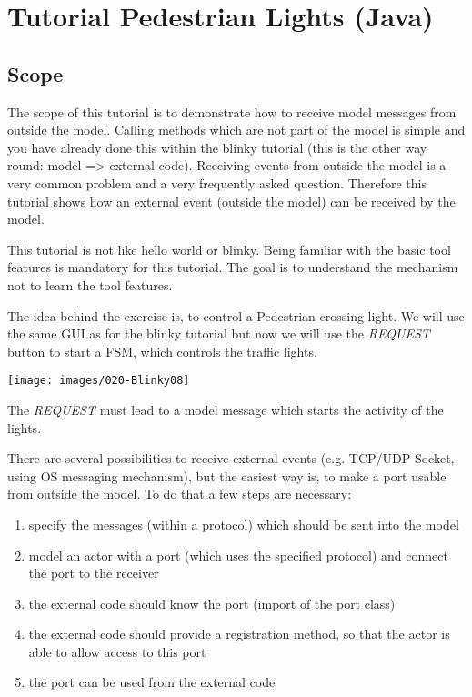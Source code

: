 \chapter{Tutorial Pedestrian Lights (Java)}

\section{Scope}

The scope of this tutorial is to demonstrate how to receive model messages from outside the model. Calling methods which are not part of the model is simple and you have already done this within the blinky tutorial (this is the other way round: model => external code). Receiving events from outside the model is a very common problem and a very frequently asked question. Therefore this tutorial shows how an external event (outside the model) can be received by the model.

This tutorial is not like hello world or blinky. Being familiar with the basic tool features is mandatory for this tutorial. The goal is to understand the mechanism not to learn the tool features.

The idea behind the exercise is, to control a Pedestrian crossing light. We will use the same GUI as for the blinky tutorial but now we will use the \textit{REQUEST} button to start a FSM, which controls the traffic lights.

\texttt{[image: images/020-Blinky08]}

The \textit{REQUEST} must lead to a model message which starts the activity of the lights.

There are several possibilities to receive external events (e.g. TCP/UDP Socket, using OS messaging mechanism), but the easiest way is, to make a port usable from outside the model. To do that a few steps are necessary:
\begin{enumerate}
\item specify the messages (within a protocol) which should be sent into the model
\item model an actor with a port (which uses the specified protocol) and connect the port to the receiver 
\item the external code should know the port (import of the port class)
\item the external code should provide a registration method, so that the actor is able to allow access to this port
\item the port can be used from the external code
\end{enumerate}

